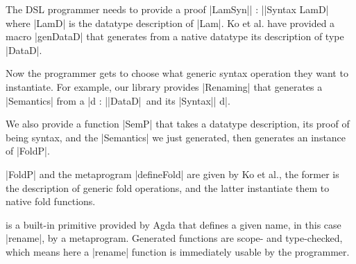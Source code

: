 \documentclass[sigplan,review,fleqn]{acmart}
\renewcommand{\verb}{\collectverb{\color{AgdaFunction}}}
\newcommand{\macro}{\collectverb{\color{AgdaMacro}}}
\newcommand{\name}{\collectverb{\it}}
\begin{document}
The DSL programmer needs to provide a proof \verb|LamSyn|\name| : |\verb|Syntax LamD| where \verb|LamD| is the datatype description of \verb|Lam|. 
Ko et al. have provided a macro \macro|genDataD| that generates from a native datatype its description of type \verb|DataD|.
\begin{code}
	\>[0]\AgdaSpace{}%
	\AgdaSymbol{=}\AgdaSpace{}%
	\AgdaSpace{}%
	\<%
\end{code}
Now the programmer gets to choose what generic syntax operation they want to instantiate.
For example, our library provides \verb|Renaming| that generates a \verb|Semantics| from a \name|d : |\verb|DataD|\ and its \verb|Syntax|\name| d|.
\begin{code}
	\>[0]\AgdaSpace{}%
	\AgdaSymbol{=}\AgdaSpace{}%
	\AgdaSpace{}%
	\AgdaSpace{}%
	\<%
\end{code}
We also provide a function \verb|SemP| that takes a datatype description, its proof of being syntax, and the \verb|Semantics| we just generated, then generates an instance of \verb|FoldP|.
\begin{code}
	\>[0]\AgdaSpace{}%
	\AgdaSymbol{=}\AgdaSpace{}%
	\AgdaSpace{}%
	\AgdaSpace{}%
	\AgdaSpace{}%
	\<%
\end{code}
\verb|FoldP| and the metaprogram \verb|defineFold| are given by Ko et al., the former is the description of generic fold operations, and the latter instantiate them to native fold functions.
\begin{code}
	\>[0]\AgdaSpace{}%
	\AgdaSpace{}%
	\AgdaSymbol{=}\AgdaSpace{}%
	\AgdaSpace{}%
	\AgdaSpace{}%
	\<%
\end{code}
 is a built-in primitive provided by Agda that defines a given name, in this case \verb|rename|, by a metaprogram.
Generated functions are scope- and type-checked, which means here a \verb|rename| function is immediately usable by the programmer.
\end{document}
